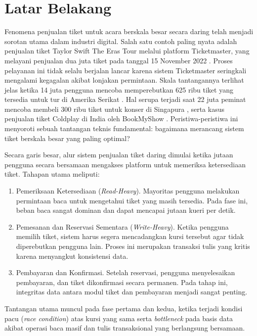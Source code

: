 \section{Latar Belakang}
\label{sec:latar-belakang}

Fenomena penjualan tiket untuk acara berskala besar secara daring telah menjadi sorotan utama dalam industri digital. Salah satu contoh paling nyata adalah penjualan tiket Taylor Swift The Eras Tour melalui platform Ticketmaster, yang melayani penjualan dua juta tiket pada tanggal 15 November 2022 \parencite{swiftTicketmaster}. Proses pelayanan ini tidak selalu berjalan lancar karena sistem Ticketmaster seringkali mengalami kegagalan akibat lonjakan permintaan. Skala tantangannya terlihat jelas ketika 14 juta pengguna mencoba memperebutkan 625 ribu tiket yang tersedia untuk tur di Amerika Serikat \parencite{USTaylorSwift}. Hal serupa terjadi saat 22 juta peminat mencoba membeli 300 ribu tiket untuk konser di Singapura \parencite{asiaTaylorSwift}, serta kasus penjualan tiket Coldplay di India oleh BookMyShow \parencite{coldplayBookMyShow}. Peristiwa-peristiwa ini menyoroti sebuah tantangan teknis fundamental: bagaimana merancang sistem tiket berskala besar yang paling optimal?

Secara garis besar, alur sistem penjualan tiket daring dimulai ketika jutaan pengguna secara bersamaan mengakses platform untuk memeriksa ketersediaan tiket. Tahapan utama meliputi:

\begin{enumerate}
    \item Pemeriksaan Ketersediaan (\textit{Read-Heavy}). Mayoritas pengguna melakukan permintaan baca untuk mengetahui tiket yang masih tersedia. Pada fase ini, beban baca sangat dominan dan dapat mencapai jutaan kueri per detik.
    \item Pemesanan dan Reservasi Sementara (\textit{Write-Heavy}). Ketika pengguna memilih tiket, sistem harus segera mencadangkan kursi tersebut agar tidak diperebutkan pengguna lain. Proses ini merupakan transaksi tulis yang kritis karena menyangkut konsistensi data.
    \item Pembayaran dan Konfirmasi. Setelah reservasi, pengguna menyelesaikan pembayaran, dan tiket dikonfirmasi secara permanen. Pada tahap ini, integritas data antara modul tiket dan pembayaran menjadi sangat penting.
\end{enumerate}

Tantangan utama muncul pada fase pertama dan kedua, ketika terjadi kondisi pacu (\textit{race condition}) atas kursi yang sama serta \textit{bottleneck} pada basis data akibat operasi baca masif dan tulis transaksional yang berlangsung bersamaan.

